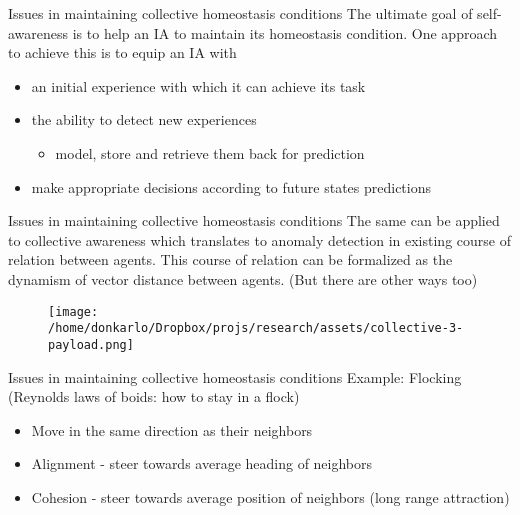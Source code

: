 \documentclass[unknownkeysallowed]{beamer}
\begin{document}
	\begin{frame}{Issues in maintaining collective homeostasis conditions}
		The ultimate goal of self-awareness is to help an IA to maintain its homeostasis condition. One approach to achieve this is to equip an IA with
		\begin{itemize}
			\item an initial experience with which it can achieve its task
			\item the ability to detect new experiences
				\begin{itemize}
					\item model, store and retrieve them back for prediction 
				\end{itemize}
			\item make appropriate decisions according to future states predictions
		\end{itemize}
	\end{frame}

	\begin{frame}{Issues in maintaining collective homeostasis conditions}
		The same can be applied to collective awareness which translates to anomaly detection in existing course of relation between agents. This course of relation can be formalized as the dynamism of vector distance between agents. (But there are other ways too) 
		
		\begin{figure}
			\texttt{[image: /home/donkarlo/Dropbox/projs/research/assets/collective-3-payload.png]}
			\caption{}
		\end{figure}
	\end{frame}
	\begin{frame}{Issues in maintaining collective homeostasis conditions}
		Example: Flocking (Reynolds laws of boids: how to stay in a flock)
		\begin{itemize}
			\item Move in the same direction as their neighbors
			\item Alignment - steer towards average heading of neighbors
			\item Cohesion - steer towards average position of neighbors (long range attraction)
		\end{itemize}
	\end{frame}
\end{document}
